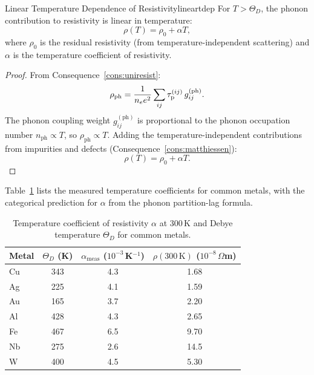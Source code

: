 \begin{consequence}{Linear Temperature Dependence of Resistivity}{lineartdep}
For $T > \Theta_D$, the phonon contribution to resistivity is linear in
temperature:
\begin{equation}
  \rho(T) = \rho_0 + \alpha T,
  \label{eq:ch18-linear}
\end{equation}
where $\rho_0$ is the residual resistivity (from temperature-independent
scattering) and $\alpha$ is the temperature coefficient of resistivity.
\end{consequence}

\begin{proof}
From Consequence~\ref{cons:uniresist}:
\begin{equation}
  \rho_{\mathrm{ph}} = \frac{1}{n_e e^2}\sum_{ij}\tau_{\mathrm{p}}^{(ij)}\,
    g_{ij}^{(\mathrm{ph})}.
\end{equation}
The phonon coupling weight $g_{ij}^{(\mathrm{ph})}$ is proportional to the
phonon occupation number $n_{\mathrm{ph}} \propto T$, so
$\rho_{\mathrm{ph}} \propto T$.  Adding the temperature-independent
contributions from impurities and defects (Consequence~\ref{cons:matthiessen}):
\begin{equation}
  \rho(T) = \rho_0 + \alpha T.
\end{equation}
\end{proof}

Table~\ref{tab:ch18-tempcoeff} lists the measured temperature coefficients
for common metals, with the categorical prediction for $\alpha$ from the
phonon partition-lag formula.

\begin{table}[htbp]
  \centering
  \caption{Temperature coefficient of resistivity $\alpha$ at 300\,K and
    Debye temperature $\Theta_D$ for common metals.}
  \label{tab:ch18-tempcoeff}
  \begin{tabular}{lccc}
    \toprule
    Metal & $\Theta_D$ (K) & $\alpha_{\mathrm{meas}}$ ($10^{-3}$\,K$^{-1}$)
      & $\rho(300\,\mathrm{K})$ ($10^{-8}$\,$\Omega$m) \\
    \midrule
    Cu & 343 & 4.3 & 1.68 \\
    Ag & 225 & 4.1 & 1.59 \\
    Au & 165 & 3.7 & 2.20 \\
    Al & 428 & 4.3 & 2.65 \\
    Fe & 467 & 6.5 & 9.70 \\
    Nb & 275 & 2.6 & 14.5 \\
    W  & 400 & 4.5 & 5.30 \\
    \bottomrule
  \end{tabular}
\end{table}

